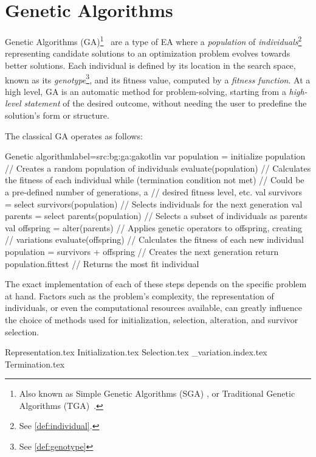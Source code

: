 \section{Genetic Algorithms}
\label{sec:bg:ga}
  Genetic Algorithms (GA)\footnote{
    Also known as Simple Genetic Algorithms (SGA) 
    \autocite{yuIntroductionEvolutionaryAlgorithms2010}, or Traditional 
    Genetic Algorithms (TGA)~\autocite{shiffmanNatureCode2012}.
  }~\autocite{hollandAdaptationNaturalArtificial1992a,kozaGeneticProgrammingProgramming1992a,yuIntroductionEvolutionaryAlgorithms2010,shiffmanNatureCode2012}
  are a type of EA where a \emph{population} of \emph{individuals}\footnote{
    See \vref{def:individual}.
  } representing candidate solutions to an optimization problem evolves towards 
  better solutions.
  Each individual is defined by its location in the search space, known as its
  \emph{genotype}\footnote{See \vref{def:genotype}}, and its fitness value, 
  computed by a \emph{fitness function}.
  At a high level, GA is an automatic method for problem-solving, starting from
  a \textit{high-level statement} of the desired outcome, without needing the
  user to predefine the solution's form or structure.

  The classical GA operates as follows:

  \begin{code}{Genetic algorithm}{label={src:bg:ga:ga}}{kotlin}
    var population = initialize population // Creates a random population of individuals
    evaluate(population) // Calculates the fitness of each individual
    while (termination condition not met) { // Could be a pre-defined number of generations, a 
                                            // desired fitness level, etc.
      val survivors = select survivors(population) // Selects individuals for the next generation
      val parents = select parents(population) // Selects a subset of individuals as parents
      val offspring = alter(parents)  // Applies genetic operators to offspring, creating 
                                      // variations
      evaluate(offspring) // Calculates the fitness of each new individual
      population = survivors + offspring // Creates the next generation
    }
    return population.fittest // Returns the most fit individual
  \end{code}

  The exact implementation of each of these steps depends on the specific 
  problem at hand.
  Factors such as the problem's complexity, the representation of individuals,
  or even the computational resources available, can greatly influence the
  choice of methods used for initialization, selection, alteration, and survivor
  selection.

  {Representation.tex}
  {Initialization.tex}
  {Selection.tex}
  {_variation.index.tex}
  {Termination.tex}
